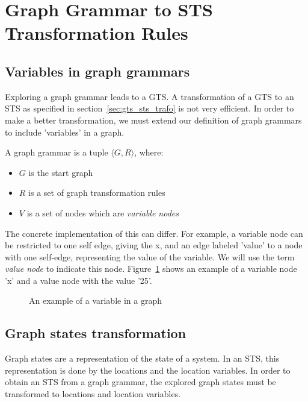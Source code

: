 \section{Graph Grammar to STS Transformation Rules}\label{sec:gg-to-sts}

\subsection{Variables in graph grammars}
Exploring a graph grammar leads to a GTS. A transformation of a GTS to an STS as specified in section~\ref{sec:gts_sts_trafo} is not very efficient. In order to make a better transformation, we must extend our definition of graph grammars to include 'variables' in a graph.
\\
\begin{definition}
A graph grammar is a tuple $\langle G, R\rangle$, where:
\begin{itemize}
  \item $G$ is the start graph
  \item $R$ is a set of graph transformation rules
  \item $V$ is a set of nodes which are \textit{variable nodes}
\end{itemize}
\end{definition}

The concrete implementation of this can differ. For example, a variable node can be restricted to one self edge, giving the x, and an edge labeled 'value' to a node with one self-edge, representing the value of the variable. We will use the term \textit{value node} to indicate this node. Figure~\ref{fig:variable_node} shows an example of a variable node 'x' and a value node with the value '25'.

\begin{figure}[ht]
  \begin{center}
    
  \end{center}
  \caption{An example of a variable in a graph}
  \label{fig:variable_node}
\end{figure}

\subsection{Graph states transformation}
Graph states are a representation of the state of a system. In an STS, this representation is done by the locations and the location variables. In order to obtain an STS from a graph grammar, the explored graph states must be transformed to locations and location variables. 

